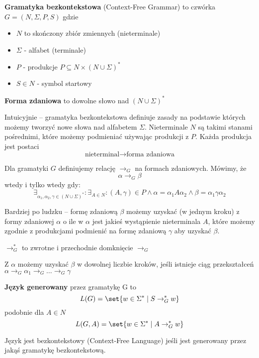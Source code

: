 \begin{definition}
	\textbf{Gramatyka bezkontekstowa} (Context-Free Grammar) to czwórka \( G = (N, \Sigma, P, S) \) gdzie
	\begin{itemize}
		\item \( N \) to skończony zbiór zmiennych (nieterminale)
		\item \( \Sigma \) - alfabet (terminale)
		\item \( P \) - produkcje \( P \subseteq N \times (N \cup \Sigma)^* \)
		\item \( S \in N \) - symbol startowy
	\end{itemize}
\end{definition}

\begin{definition}
	\textbf{Forma zdaniowa} to dowolne słowo nad \( (N \cup \Sigma)^* \)
\end{definition}

Intuicyjnie -- gramatyka bezkontekstowa definiuje zasady na podstawie których możemy tworzyć nowe słowa nad alfabetem \( \Sigma \).
Nieterminale \( N \) są takimi stanami pośrednimi, które możemy podmieniać używając produkcji z \( P \).
Każda produkcja jest postaci
\[
	\text{nieterminal} \rightarrow \text{forma zdaniowa}
\]


\begin{definition}
	Dla gramatyki \( G \) definiujemy relację \( \rightarrow_G \) na formach zdaniowych.
	Mówimy, że
	\[
		\alpha \rightarrow_G \beta
	\]
	wtedy i tylko wtedy gdy:
	\[
		\exists_{\alpha_1, \alpha_2, \gamma \in (N \cup \Sigma)^*} : \exists_{A \in N} : (A, \gamma) \in P \land
		\alpha = \alpha_1  A \alpha_2 \land \beta = \alpha_1 \gamma \alpha_2
	\]
\end{definition}

Bardziej po ludzku -- formę zdaniową \( \beta \) możemy uzyskać (w jednym kroku) z formy zdaniowej \( \alpha \) o ile w  \( \alpha \) jest jakieś wystąpienie nieterminala \( A \), które możemy zgodnie z produkcjami podmienić na formę zdaniową \( \gamma \) aby uzyskać \( \beta \).

\begin{definition}
	\( \rightarrow_G^* \) to zwrotne i przechodnie domknięcie \( \rightarrow_G \)
\end{definition}

Z \( \alpha \) możemy uzyskać \( \beta \) w dowolnej liczbie kroków, jeśli istnieje ciąg przekształceń \( \alpha \rightarrow_G \alpha_1 \rightarrow_G \dots \rightarrow_G \gamma \)


\begin{definition}
	\textbf{Język  generowany} przez gramatykę G to
	\[
		L(G) = \set{w \in \Sigma^* \mid S \rightarrow_G^* w}
	\]
	podobnie dla \( A \in N \)
	\[
		L(G, A) = \set{w \in \Sigma^* \mid A \rightarrow_G^* w}
	\]
\end{definition}

\begin{definition}
	Język jest bezkontekstowy (Context-Free Language) jeśli jest generowany przez jakąś gramatykę bezkontekstową.
\end{definition}